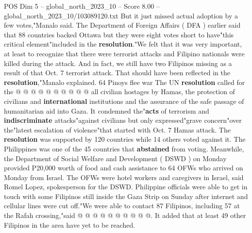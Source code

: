 \begin{textsample}{POS Dim 5 – global\_north\_2023\_10 – Score 8.00 – global\_north\_2023\_10/103089120.txt}
But it just missed actual adoption by a few votes,"Manalo said.
The Department of Foreign Affairs ( DFA ) earlier said that 88 countries backed Ottawa but they were eight votes short to have"this critical element"included in the \textbf{resolution}."We felt that it was very important, at least to recognize that there were terrorist attacks and Filipino nationals were killed during the attack.
And in fact, we still have two Filipinos missing as a result of that Oct. 7 terrorist attack.
That should have been reflected in the \textbf{resolution},"Manalo explained. 64 Pinoys flee war The UN \textbf{resolution} called for the @ @ @ @ @ @ @ @ @ @ all civilian hostages by Hamas, the protection of civilians and \textbf{international} institutions and the assurance of the safe passage of humanitarian aid into Gaza.
It condemned the"\textbf{acts} of terrorism and \textbf{indiscriminate} attacks"against civilians but only expressed"grave concern"over the"latest escalation of violence"that started with Oct. 7 Hamas attack.
The \textbf{resolution} was supported by 120 countries while 14 others voted against it.
The Philippines was one of the 45 countries that \textbf{abstained} from voting.
Meanwhile, the Department of Social Welfare and Development ( DSWD ) on Monday provided P20,000 worth of food and cash assistance to 64 OFWs who arrived on Monday from Israel.
The OFWs were hotel workers and caregivers in Israel, said Romel Lopez, spokesperson for the DSWD.
Philippine officials were able to get in touch with some Filipinos still inside the Gaza Strip on Sunday after internet and cellular lines were cut off."We were able to contact 87 Filipinos, including 57 at the Rafah crossing,"said @ @ @ @ @ @ @ @ @ @.
It added that at least 49 other Filipinos in the area have yet to be reached.

\end{textsample}
